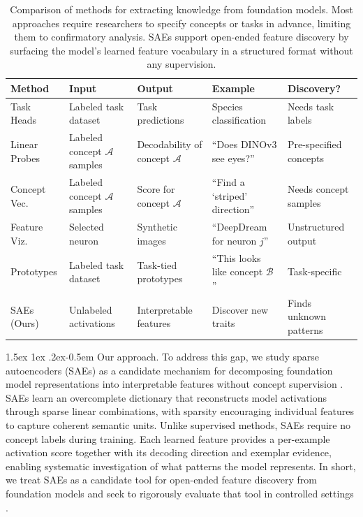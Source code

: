 \documentclass[10pt,twocolumn,letterpaper]{article}
\makeatletter
\renewcommand{\paragraph}{%
  \@startsection{paragraph}{4}%
  {\z@}{1.5ex \@plus 1ex \@minus .2ex}{-0.5em}%
  {\normalfont\normalsize\bfseries}%
}
\newcommand{\cmark}{\textcolor{green}{\ding{51}}}
\newcommand{\xmark}{\textcolor{red}{\ding{55}}}
\makeatother
\begin{document}
\begin{table}[t]
    \centering
    \small
    \renewcommand{\arraystretch}{1.2}
    \setlength{\tabcolsep}{4pt}
    \caption{Comparison of methods for extracting knowledge from foundation models. Most approaches require researchers to specify concepts or tasks in advance, limiting them to confirmatory analysis. 
    SAEs support open-ended feature discovery by surfacing the model's learned feature vocabulary in a structured format without any supervision.
    }
    \label{tab:related-work}
    \begin{tabular}{lllll}
    \toprule
    \textbf{Method} & \textbf{Input} & \textbf{Output} & \textbf{Example} & \textbf{Discovery?} \\
    \midrule
    Task Heads & Labeled task dataset & Task predictions & Species classification & \xmark{} Needs task labels \\
    Linear Probes & Labeled concept $\mathcal{A}$ samples & Decodability of concept $\mathcal{A}$ & ``Does DINOv3 see eyes?'' & \xmark{} Pre-specified concepts \\
    Concept Vec. & Labeled concept $\mathcal{A}$ samples & Score for concept $\mathcal{A}$ & ``Find a `striped' direction'' & \xmark{} Needs concept samples \\
    Feature Viz. & Selected neuron & Synthetic images & ``DeepDream for neuron $j$'' & \xmark{} Unstructured output \\
    Prototypes & Labeled task dataset & Task-tied prototypes & ``This looks like concept $\mathcal{B}$'' & \xmark{} Task-specific \\
    SAEs (Ours) & Unlabeled activations & Interpretable features & Discover new traits & \cmark{} Finds unknown patterns \\
    \bottomrule
    \end{tabular}
\end{table}

\paragraph{Our approach.}
To address this gap, we study sparse autoencoders (SAEs) as a candidate mechanism for decomposing foundation model representations into interpretable features without concept supervision \citep{bricken2023monosemanticity,templeton2024scaling,cunningham2023sparse,gao2025scaling}.
SAEs learn an overcomplete dictionary that reconstructs model activations through sparse linear combinations, with sparsity encouraging individual features to capture coherent semantic units.
Unlike supervised methods, SAEs require no concept labels during training.
Each learned feature provides a per-example activation score together with its decoding direction and exemplar evidence, enabling systematic investigation of what patterns the model represents.
In short, we treat SAEs as a candidate tool for open-ended feature discovery from foundation models and seek to rigorously evaluate that tool in controlled settings \citep{peng2025unknown}.
\end{document}
